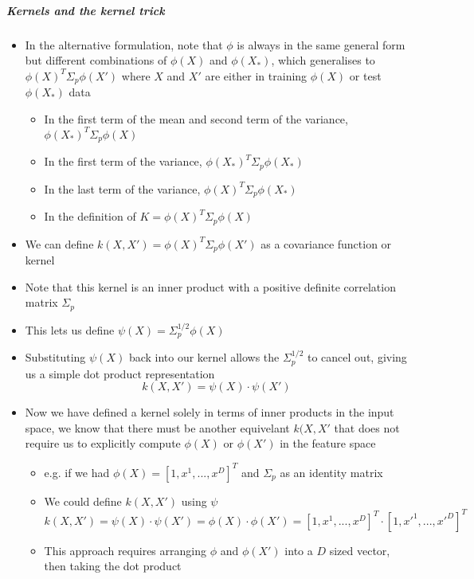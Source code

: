 \documentclass[12pt]{article}
\begin{document}
\subparagraph{Kernels and the kernel trick}
\begin{itemize}
    \item In the alternative formulation, note that $\phi$ is always in the same general form but different combinations of $\phi(X)$ and $\phi(X_*)$, which generalises to $\phi(X)^T\Sigma_p\phi(X')$ where $X$ and $X'$ are either in training $\phi(X)$ or test $\phi(X_*)$ data
    \begin{itemize}
        \item In the first term of the mean and second term of the variance, $\phi(X_*)^T\Sigma_p\phi(X)$
        \item In the first term of the variance, $\phi(X_*)^T\Sigma_p\phi(X_*)$
        \item In the last term of the variance, $\phi(X)^T\Sigma_p\phi(X_*)$
        \item In the definition of $K = \phi(X)^T\Sigma_p\phi(X)$
    \end{itemize}
    \item We can define $k(X,X') = \phi(X)^T\Sigma_p\phi(X')$ as a covariance function or kernel
    \item Note that this kernel is an inner product with a positive definite correlation matrix $\Sigma_p$
    \item This lets us define $\psi(X) = \Sigma_p^{1/2}\phi(X)$
    \item Substituting $\psi(X)$ back into our kernel allows the $\Sigma_p^{1/2}$ to cancel out, giving us a simple dot product representation  
\begin{equation}
    k(X,X') = \psi(X) \cdot \psi(X')
\end{equation}
    \item Now we have defined a kernel solely in terms of inner products in the input space, we know that there must be another equivelant $k(X, X'$ that does not require us to explicitly compute $\phi(X)$ or $\phi(X')$ in the feature space
    \begin{itemize}
        \item e.g. if we had $\phi(X) = [1, x^1, ..., x^D]^T$ and $\Sigma_p$ as an identity matrix
        \item We could define $k(X,X')$ using $\psi$
\begin{equation}
    k(X,X') = \psi(X) \cdot \psi(X') = \phi(X) \cdot \phi(X') = [1, x^1, ..., x^D]^T \cdot [1, x'^1, ..., x'^D]^T
\end{equation}
        \item This approach requires arranging $\phi$ and $\phi(X')$ into a $D$ sized vector, then taking the dot product

\end{itemize}
\end{itemize}
\end{document}
